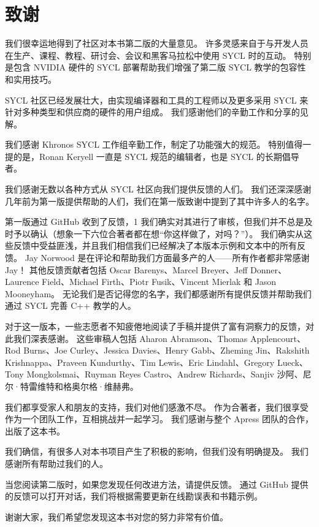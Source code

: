 \section*{致谢}
我们很幸运地得到了社区对本书第二版的大量意见。 许多灵感来自于与开发人员在生产、课程、教程、研讨会、会议和黑客马拉松中使用 SYCL 时的互动。 特别是包含 NVIDIA 硬件的 SYCL 部署帮助我们增强了第二版 SYCL 教学的包容性和实用技巧。

SYCL 社区已经发展壮大，由实现编译器和工具的工程师以及更多采用 SYCL 来针对多种类型和供应商的硬件的用户组成。 我们感谢他们的辛勤工作和分享的见解。

我们感谢 Khronos SYCL 工作组辛勤工作，制定了功能强大的规范。 特别值得一提的是，Ronan Keryell 一直是 SYCL 规范的编辑者，也是 SYCL 的长期倡导者。

我们感谢无数以各种方式从 SYCL 社区向我们提供反馈的人们。 我们还深深感谢几年前为第一版提供帮助的人们，我们在第一版致谢中提到了其中许多人的名字。

第一版通过 GitHub 收到了反馈，1 我们确实对其进行了审核，但我们并不总是及时予以确认（想象一下六位合著者都在想“你这样做了，对吗？”）。 我们确实从这些反馈中受益匪浅，并且我们相信我们已经解决了本版本示例和文本中的所有反馈。 Jay Norwood 是在评论和帮助我们方面最多产的人——所有作者都非常感谢 Jay！ 其他反馈贡献者包括 Oscar Barenys、Marcel Breyer、Jeff Donner、Laurence Field、Michael Firth、Piotr Fusik、Vincent Mierlak 和 Jason Mooneyham。 无论我们是否记得您的名字，我们都感谢所有提供反馈并帮助我们通过 SYCL 完善 C++ 教学的人。


对于这一版本，一些志愿者不知疲倦地阅读了手稿并提供了富有洞察力的反馈，对此我们深表感谢。 这些审稿人包括 Aharon Abramson、Thomas Applencourt、Rod Burns、Joe Curley、Jessica Davies、Henry Gabb、Zheming Jin、Rakshith Krishnappa、Praveen Kundurthy、Tim Lewis、Eric Lindahl、Gregory Lueck、Tony Mongkolsmai、Ruyman Reyes Castro、Andrew Richards、Sanjiv 沙阿、尼尔·特雷维特和格奥尔格·维赫弗。

我们都享受家人和朋友的支持，我们对他们感激不尽。 作为合著者，我们很享受作为一个团队工作，互相挑战并一起学习。 我们感谢与整个 Apress 团队的合作，出版了这本书。

我们确信，有很多人对本书项目产生了积极的影响，但我们没有明确提及。 我们感谢所有帮助过我们的人。

当您阅读第二版时，如果您发现任何改进方法，请提供反馈。 通过 GitHub 提供的反馈可以打开对话，我们将根据需要更新在线勘误表和书籍示例。

谢谢大家，我们希望您发现这本书对您的努力非常有价值。
